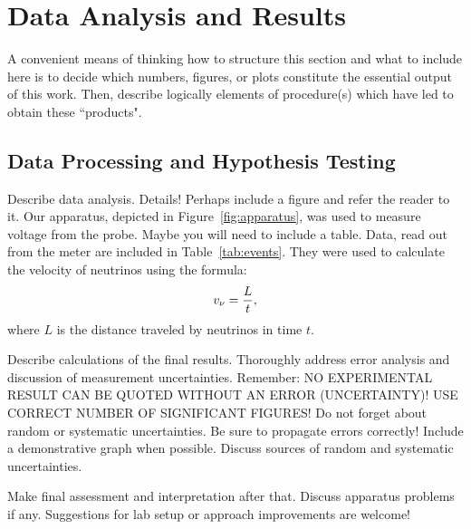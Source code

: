 \documentclass[11pt,letterpaper,onecolumn]{article}
\begin{document}
\section{Data Analysis and Results}

A convenient means of thinking how to structure this section and what to 
include here is to decide which numbers, figures, or plots constitute the
essential output of this work. Then, describe logically elements of procedure(s)
which have led to obtain these ``products".


\subsection{Data Processing and Hypothesis Testing}

Describe data analysis. Details! Perhaps include a figure and refer
the reader to it.  Our apparatus, depicted in Figure~\ref{fig:apparatus},
was used to measure voltage from the probe. Maybe you will need
to include a table. Data, read out from the meter are included
in Table~\ref{tab:events}. They were used to calculate the velocity of
neutrinos using the formula:
$$ v_\nu = {L \over t},$$
where $L$ is the distance traveled by neutrinos in time $t$.

Describe calculations of the final results.
Thoroughly address error analysis and discussion of measurement
uncertainties. Remember: NO EXPERIMENTAL RESULT CAN BE QUOTED
WITHOUT AN ERROR (UNCERTAINTY)! 
USE CORRECT NUMBER OF SIGNIFICANT FIGURES!
Do not forget about random or systematic
uncertainties. Be sure to propagate errors correctly!
Include a demonstrative graph when possible.
Discuss sources of random and systematic uncertainties.

Make final assessment and interpretation after that.
Discuss apparatus problems if any. Suggestions for
lab setup or approach improvements are welcome!


\end{document}
